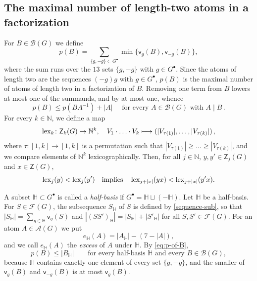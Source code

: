 \documentclass[a4paper, 10pt]{amsart}
\theoremstyle{plain}
\theoremstyle{definition}
\theoremstyle{definition}
\newcommand{\N}{\mathbb N}
\numberwithin{equation}{section}
\begin{document}
\subsection{The maximal number of length-two atoms in a factorization}\label{sec:software:length-two-atoms}

For $B \in \mathcal B (G)$ we define
\begin{equation}
 p(B)=\sum_{\{g,-g\} \subset G^{\bullet}}
       \min\{\mathsf v_g(B),\mathsf v_{-g}(B)\} ,       \label{eq:p-of-B}
\end{equation}
where the sum runs over the $13$ sets $\{g,-g\}$ with $g \in G^{\bullet}$.
Since the atoms of length two are the sequences $(-g)g$ with
$g \in G^{\bullet}$, $p(B)$ is the maximal number of atoms of length two in a
factorization of $B$.  Removing one term from $B$ lowers at most one of the
summands, and by at most one, whence
\begin{equation} \label{eq:removing-one-term}
p(B) \le p(BA^{-1}) + |A| \quad \text{ for every $A \in \mathcal B (G)$ with $A \mid B$} \,.
\end{equation}
For every $k \in \N$, we define a map
\[
\lex_k \colon \mathsf Z_k (G) \to \N^k, \quad V_1 \cdot \ldots \cdot V_k \longmapsto (|V_{\tau (1)}|, \ldots, |V_{\tau (k)}|) \,,
\]
where $\tau \colon [1,k] \to [1,k]$ is a permutation such that
$|V_{\tau (1)}| \ge \ldots \ge |V_{\tau (k)}|$, and we compare elements of
$\N^k$ lexicographically.  Then, for all $j \in \N$, $y, y' \in \mathsf Z_j (G)$
and $x \in \mathsf Z (G)$,
\begin{equation}
 \operatorname{lex}_j (y) < \operatorname{lex}_j (y')
 \quad \text{implies} \quad
 \operatorname{lex}_{j+|x|} (yx) < \operatorname{lex}_{j+|x|} (y'x) . \label{eq:lex-monotone}
\end{equation}

A subset $\mathbb H \subset G^{\bullet}$ is called a \emph{half-basis} if
$G^{\bullet} = \mathbb H \sqcup (- \mathbb H)$.  Let $\mathbb H$ be a
half-basis.  For $S \in \mathcal F (G)$, the subsequence $S_{\mathbb H}$ of $S$ is
defined by \eqref{sequence-sub}, so that
$|S_{\mathbb H}| = \sum_{g \in \mathbb H} \mathsf v_g (S)$ and $|(SS')_{\mathbb H}| = |S_{\mathbb H}| + |S'_{\mathbb H}|$ for
all $S, S' \in \mathcal F (G)$.  For an atom $A \in \mathcal A (G)$ we put
\begin{equation}
 e_{\mathbb H} (A)=|A_{\mathbb H}|-(7-|A|) ,\label{eq:orientation-excess}
\end{equation}
and we call $e_{\mathbb H} (A)$ the \emph{excess} of $A$ under $\mathbb H$.  By
\eqref{eq:p-of-B},
\begin{equation}
 p(B) \le |B_{\mathbb H}| \qquad \text{for every half-basis $\mathbb H$ and every $B \in \mathcal B (G)$} , \label{eq:budget-by-choice}
\end{equation}
because $\mathbb H$ contains exactly one element of every set $\{g,-g\}$,
and the smaller of $\mathsf v_g (B)$ and $\mathsf v_{-g} (B)$ is at most
$\mathsf v_g (B)$.
\end{document}
